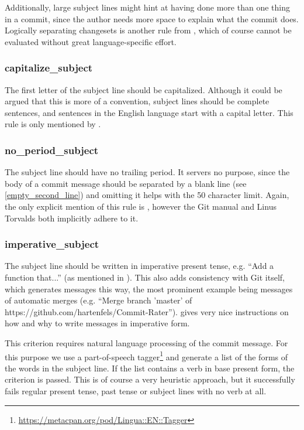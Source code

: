 Additionally, large subject lines might hint at having done more than one thing in a commit, since the author needs more space to explain what the commit does. Logically separating changesets is another rule from \cite{OffGuide}, which of course cannot be evaluated without great language-specific effort.

\subsubsection{capitalize\_subject}
\label{subs:capitalize_subject}
The first letter of the subject line should be capitalized. Although it could be argued that this is more of a convention, subject lines should be complete sentences, and sentences in the English language start with a capital letter. This rule is only mentioned by \cite{CB}.

\subsubsection{no\_period\_subject}
\label{subs:no_period_subject}
The subject line should have no trailing period. It servers no purpose, since the body of a commit message should be separated by a blank line (see \ref{empty_second_line}) and omitting it helps with the 50 character limit. Again, the only explicit mention of this rule is \cite{CB}, however the Git manual \cite{OffGuide} and Linus Torvalds \cite{SR} both implicitly adhere to it.

\subsubsection{imperative\_subject}
\label{subs:imperative_subject}
The subject line should be written in imperative present tense, e.g. ``Add a function that...'' (as mentioned in \cite{OffGuide}). This also adds consistency with Git itself, which generates messages this way, the most prominent example being messages of automatic merges (e.g. ``Merge branch 'master' of https://github.com/hartenfels/Commit-Rater''). \cite{CB} gives very nice instructions on how and why to write messages in imperative form.

This criterion requires natural language processing of the commit message. For this purpose we use a part-of-speech tagger\footnote{\url{https://metacpan.org/pod/Lingua::EN::Tagger}} and generate a list of the forms of the words in the subject line. If the list contains a verb in base present form, the criterion is passed. This is of course a very heuristic approach, but it successfully fails regular present tense, past tense or subject lines with no verb at all.

